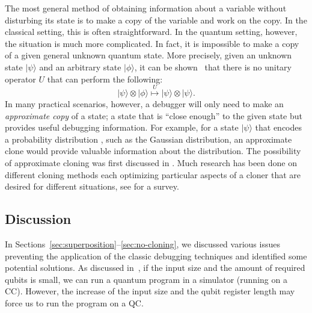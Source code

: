 \documentclass[11pt]{article}
\theoremstyle{plain}
\theoremstyle{definition}
\newcommand{\ldbrac}[1]{\lvert#1\rangle}
\begin{document}
The most general method of obtaining information about a variable without disturbing its state is 
to make a copy of the variable and work on the copy. In the classical setting, this is often 
straightforward. In the quantum setting, however, the situation is much more complicated. In fact, 
it is impossible to make a copy of a given general unknown quantum state. More precisely, given an 
unknown state $\ldbrac{\psi}$ and an arbitrary state $\ldbrac{\phi}$, it can be shown~\cite[Theorem 
10.4.1]{kaye2007introduction} that 
there is no unitary operator $U$ that can perform the following:
\[ \ldbrac{\psi} \otimes \ldbrac{\phi} \overset{U}{\longmapsto} \ldbrac{\psi} \otimes 
\ldbrac{\psi}. \] 
In many practical scenarios, however, a debugger will only need to make an \textit{approximate 
copy} 
of a state; a state that is ``close enough'' to the given state but provides useful debugging 
information. For example, for a state $\ldbrac{\psi}$ that encodes a probability distribution 
\cite{grover2002creating}, such as
the Gaussian distribution, an approximate clone would provide valuable information about the 
distribution.
The possibility of approximate cloning was first discussed in \cite{buvzek1996quantum}. 
Much research has been done on different cloning methods each optimizing particular aspects of a 
cloner that are desired for different situations, see \cite{scarani2005quantum} for a survey. 



\subsection{Discussion}
In Sections~\ref{sec:superposition}--\ref{sec:no-cloning}, we discussed various issues preventing 
the application of the classic debugging techniques and identified some potential solutions. 
As discussed in~\cite{miranskyy2019testing}, if the input size and the amount of required qubits is 
small, we can run a quantum program in a simulator (running on a CC). However, the increase of the 
input size and the qubit register length may force us to run the program on a QC. 
\end{document}
